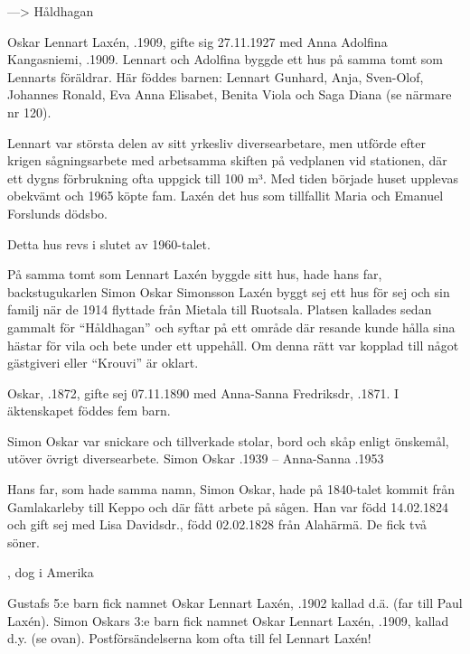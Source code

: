 --->  Håldhagan

Oskar Lennart Laxén, .1909, gifte sig 27.11.1927 med Anna Adolfina Kangasniemi, .1909. Lennart och Adolfina byggde ett hus på samma tomt som Lennarts föräldrar. Här föddes barnen: Lennart Gunhard, Anja, Sven-Olof, Johannes Ronald, Eva Anna Elisabet, Benita Viola och Saga Diana (se närmare nr 120).

Lennart var största delen av sitt yrkesliv diversearbetare, men utförde efter krigen sågningsarbete med arbetsamma skiften på vedplanen vid stationen, där ett dygns förbrukning ofta uppgick till 100 m³. Med tiden började huset upplevas obekvämt och 1965 köpte fam. Laxén det hus som tillfallit Maria och Emanuel Forslunds dödsbo.

Detta hus revs i slutet av 1960-talet.


På samma tomt som Lennart Laxén byggde sitt hus, hade hans far, backstugukarlen Simon Oskar Simonsson Laxén byggt sej ett hus för sej och sin familj när de 1914 flyttade från Mietala till Ruotsala. Platsen kallades sedan gammalt för ``Håldhagan'' och syftar på ett område där resande kunde hålla sina hästar för vila och bete under ett uppehåll. Om denna rätt var kopplad till något gästgiveri eller ``Krouvi'' är oklart.

Oskar, .1872, gifte sej 07.11.1890 med Anna-Sanna Fredriksdr, .1871. I äktenskapet föddes fem barn.
\begin{jhchildren}
  \item {}
  \item {}
  \item {}
  \item {}
  \item {}
\end{jhchildren}
Simon Oskar var snickare och tillverkade stolar, bord och skåp enligt önskemål, utöver övrigt diversearbete.
Simon Oskar .1939  --  Anna-Sanna .1953

Hans far, som hade samma namn, Simon Oskar, hade på 1840-talet kommit från Gamlakarleby till Keppo och där fått arbete på sågen. Han var född 14.02.1824 och gift sej med Lisa Davidsdr., född 02.02.1828 från Alahärmä. De fick två söner.
\begin{jhchildren}
  \item {}, dog i Amerika
  \item {}
\end{jhchildren}
Gustafs  5:e barn fick namnet Oskar Lennart Laxén, .1902 kallad  d.ä. (far till Paul Laxén). Simon Oskars 3:e barn fick namnet Oskar Lennart Laxén, .1909, kallad d.y. (se ovan). Postförsändelserna kom ofta till fel Lennart Laxén!



